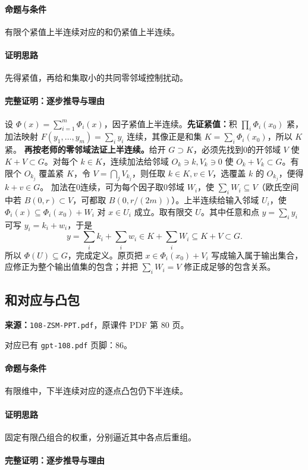 \paragraph{命题与条件}有限个紧值上半连续对应的和仍紧值上半连续。
\paragraph{证明思路}先得紧值，再给和集取小的共同零邻域控制扰动。
\paragraph{完整证明：逐步推导与理由}

设 $\Phi(x)=\sum_{i=1}^m\Phi_i(x)$，因子紧值上半连续。\textbf{先证紧值：}积 $\prod_i\Phi_i(x_0)$ 紧，加法映射 $F(y_1,\ldots,y_m)=\sum_iy_i$ 连续，其像正是和集 $K=\sum_i\Phi_i(x_0)$，所以 $K$ 紧。
\textbf{再按老师的零邻域法证上半连续。}给开 $G\supset K$，必须先找到0的开邻域 $V$ 使 $K+V\subset G$。对每个 $k\in K$，连续加法给邻域 $O_k\ni k,V_k\ni0$ 使 $O_k+V_k\subset G$。有限个 $O_{k_j}$ 覆盖紧 $K$，令 $V=\bigcap_jV_{k_j}$，则任取 $k\in K,v\in V$，选覆盖 $k$ 的 $O_{k_j}$，便得 $k+v\in G$。
加法在0连续，可为每个因子取0邻域 $W_i$，使 $\sum_iW_i\subseteq V$（欧氏空间中若 $B(0,r)\subset V$，可都取 $B(0,r/(2m))$）。上半连续给输入邻域 $U_i$，使 $\Phi_i(x)\subseteq\Phi_i(x_0)+W_i$ 对 $x\in U_i$ 成立。取有限交 $U$。其中任意和点 $y=\sum_iy_i$ 可写 $y_i=k_i+w_i$，于是
\[y=\sum_i k_i+\sum_iw_i\in K+\sum_iW_i\subseteq K+V\subset G.\]
所以 $\Phi(U)\subseteq G$，完成定义。原页把 $x\in\Phi_i(x_0)+V_i$ 写成输入属于输出集合，应修正为整个输出值集的包含；并把 $\sum_iW_i=V$ 修正成足够的包含关系。

\clearpage\subsection{和对应与凸包}
\textbf{来源：}\texttt{108-ZSM-PPT.pdf}，原课件 PDF 第 80 页。\par
对应已有 \texttt{gpt-108.pdf} 页脚：86。\par
\paragraph{命题与条件}有限维中，下半连续对应的逐点凸包仍下半连续。
\paragraph{证明思路}固定有限凸组合的权重，分别逼近其中各点后重组。
\paragraph{完整证明：逐步推导与理由}

